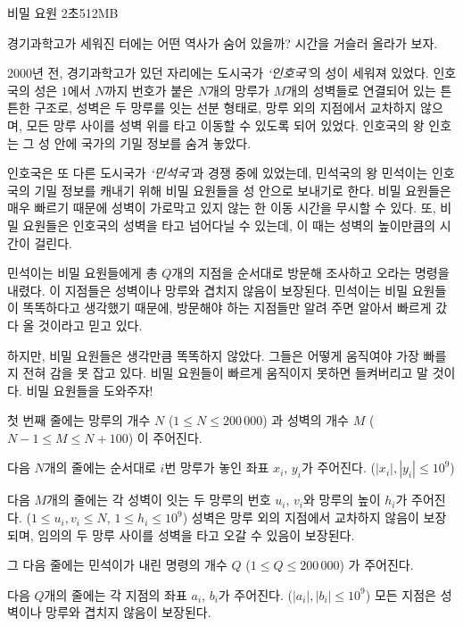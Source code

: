 \begin{problem}{비밀 요원}
{}{}
{2초}{512MB}{}

경기과학고가 세워진 터에는 어떤 역사가 숨어 있을까? 시간을 거슬러 올라가 보자.

2000년 전, 경기과학고가 있던 자리에는 도시국가 \textit{`인호국'}의 성이 세워져 있었다. 인호국의 성은 $1$에서 $N$까지 번호가 붙은 $N$개의 망루가 $M$개의 성벽들로 연결되어 있는 튼튼한 구조로, 성벽은 두 망루를 잇는 선분 형태로, 망루 외의 지점에서 교차하지 않으며, 모든 망루 사이를 성벽 위를 타고 이동할 수 있도록 되어 있었다. 인호국의 왕 인호는 그 성 안에 국가의 기밀 정보를 숨겨 놓았다.

인호국은 또 다른 도시국가 \textit{`민석국'}과 경쟁 중에 있었는데, 민석국의 왕 민석이는 인호국의 기밀 정보를 캐내기 위해 비밀 요원들을 성 안으로 보내기로 한다. 비밀 요원들은 매우 빠르기 때문에 성벽이 가로막고 있지 않는 한 이동 시간을 무시할 수 있다. 또, 비밀 요원들은 인호국의 성벽을 타고 넘어다닐 수 있는데, 이 때는 성벽의 높이만큼의 시간이 걸린다.

민석이는 비밀 요원들에게 총 $Q$개의 지점을 순서대로 방문해 조사하고 오라는 명령을 내렸다. 이 지점들은 성벽이나 망루와 겹치지 않음이 보장된다. 민석이는 비밀 요원들이 똑똑하다고 생각했기 때문에, 방문해야 하는 지점들만 알려 주면 알아서 빠르게 갔다 올 것이라고 믿고 있다.

하지만, 비밀 요원들은 생각만큼 똑똑하지 않았다. 그들은 어떻게 움직여야 가장 빠를지 전혀 감을 못 잡고 있다. 비밀 요원들이 빠르게 움직이지 못하면 들켜버리고 말 것이다. 비밀 요원들을 도와주자!

\InputFile

첫 번째 줄에는 망루의 개수 $N$ ($1 \le N \le 200\, 000$) 과 성벽의 개수 $M$ ($N-1 \le M \le N+100$) 이 주어진다.

다음 $N$개의 줄에는 순서대로 $i$번 망루가 놓인 좌표 $x_i$, $y_i$가 주어진다. ($|x_i|, |y_i| \le 10^9$)

다음 $M$개의 줄에는 각 성벽이 잇는 두 망루의 번호 $u_i$, $v_i$와 망루의 높이 $h_i$가 주어진다. ($1 \le u_i, v_i \le N$, $1 \le h_i \le 10^9$) \newline
성벽은 망루 외의 지점에서 교차하지 않음이 보장되며, 임의의 두 망루 사이를 성벽을 타고 오갈 수 있음이 보장된다.

그 다음 줄에는 민석이가 내린 명령의 개수 $Q$ ($1 \le Q \le 200\, 000$) 가 주어진다.

다음 $Q$개의 줄에는 각 지점의 좌표 $a_i$, $b_i$가 주어진다. ($|a_i|, |b_i| \le 10^9$) \newline
모든 지점은 성벽이나 망루와 겹치지 않음이 보장된다.


\end{problem}
